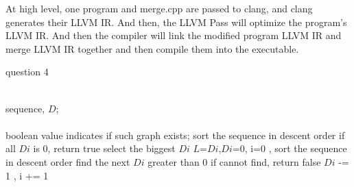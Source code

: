 \documentclass[11pt]{article}
\begin{document}
At high level, one program and merge.cpp are passed to clang, and clang generates their LLVM IR. And then, the LLVM Pass will optimize the {program's} LLVM IR. And then the compiler will link the modified program LLVM IR and merge LLVM IR together and then compile them into the executable.




\begin{algorithm}[htb]
\caption{ question 4 }
\begin{algorithmic}[4]
\REQUIRE ~~\\
    sequence, $D$;\\
\ENSURE ~~\\
    boolean value indicates if such graph exists;
\STATE sort the sequence in descent order
    \STATE if all $Di$ is 0, return true
    \STATE select the biggest $Di$
    \STATE $L$=$Di$,$Di$=0, i=0 , sort the sequence in descent order
        \STATE find the next $Di$ greater than  0
        \STATE if cannot find, return false
        \STATE $Di$ -= 1 , i += 1
    \ENDWHILE
\ENDWHILE

\end{algorithmic}
\end{algorithm}

%	
\end{document}
